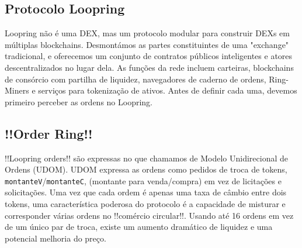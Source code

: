 \documentclass[UTF8,nofonts]{article}
\begin{document}
\begin{multicols}{2}
\section{Protocolo Loopring\label{sec:loopring_protocol}}
Loopring não é uma DEX, mas um protocolo modular para construir DEXs em múltiplas blockchains. Desmontámos as partes constituintes de uma "exchange" tradicional, e oferecemos um conjunto de contratos públicos inteligentes e atores descentralizados no lugar dela. As funções da rede incluem carteiras, blockchains de consórcio com partilha de liquidez, navegadores de caderno de ordens, Ring-Miners e serviços para tokenização de ativos. Antes de definir cada uma, devemos primeiro perceber as ordens no Loopring.

\subsection{!!Order Ring!!\label{sec:order_ring}}
!!Loopring orders!! são expressas no que chamamos de Modelo Unidirecional de Ordens (UDOM)\cite{coinport2014udom}. UDOM expressa as ordens como pedidos de troca de tokens, \verb|montanteV|/\verb|montanteC|, (montante para venda/compra) em vez de licitações e solicitações. Uma vez que cada ordem é apenas uma taxa de câmbio entre dois tokens, uma característica poderosa do protocolo é a capacidade de misturar e corresponder várias ordens no !!comércio circular!!. Usando até 16 ordens em vez de um único par de troca, existe um aumento dramático de liquidez e uma potencial melhoria do preço.


\end{multicols}
\end{document}
